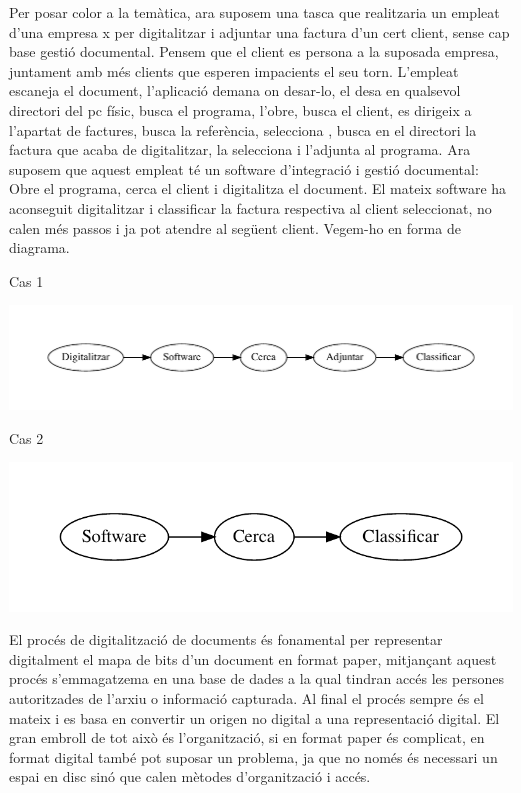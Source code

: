 \documentclass[letterpaper,11pt,catalan]{sphinxmanual}
\begin{document}
Per posar color a la temàtica, ara suposem una tasca que realitzaria un empleat d'una empresa x
per digitalitzar i adjuntar una factura d'un cert client, sense cap base gestió documental.
Pensem que el client es persona a la suposada empresa, juntament amb més clients que esperen
impacients el seu torn. L'empleat escaneja el document, l'aplicació demana on desar-lo,
el desa en qualsevol directori del pc físic, busca el programa, l'obre, busca el client, es
dirigeix a l'apartat de factures, busca la referència, selecciona ,
busca en el directori la factura que acaba de digitalitzar, la selecciona i l'adjunta al programa.
Ara suposem que aquest empleat té un software
d'integració i gestió documental: Obre el programa, cerca el client i digitalitza el document.
El mateix software ha aconseguit digitalitzar i classificar la factura respectiva al client
seleccionat, no calen més passos i ja pot atendre al següent client. Vegem-ho en forma de diagrama.

Cas 1

\includegraphics{graphviz-730df8cc302261870b3aa4a08e51901844830eb1.pdf}

Cas 2

\includegraphics{graphviz-c379de371ff5e28e2a5a8c8e959c158df1237304.pdf}

El procés de digitalització de documents és fonamental per representar digitalment el mapa de
bits d'un document en format paper, mitjançant aquest procés s'emmagatzema en una base de dades a la
qual tindran accés les persones autoritzades de l'arxiu o informació capturada. Al final el procés
sempre és el mateix i es basa en convertir un origen no digital a una representació digital. El gran
embroll de tot això és l'organització, si en format paper és complicat, en format digital també
pot suposar un problema, ja que no només és necessari un espai en disc sinó que calen mètodes
d'organització i accés.
\end{document}
